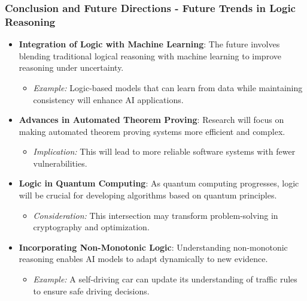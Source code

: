 \documentclass[aspectratio=169]{beamer}
\begin{document}
\begin{frame}[fragile]
    \frametitle{Conclusion and Future Directions - Future Trends in Logic Reasoning}
    \begin{itemize}
        \item \textbf{Integration of Logic with Machine Learning}:
        The future involves blending traditional logical reasoning with machine learning to improve reasoning under uncertainty.
        \begin{itemize}
            \item \textit{Example:} Logic-based models that can learn from data while maintaining consistency will enhance AI applications.
        \end{itemize}
        
        \item \textbf{Advances in Automated Theorem Proving}:
        Research will focus on making automated theorem proving systems more efficient and complex.
        \begin{itemize}
            \item \textit{Implication:} This will lead to more reliable software systems with fewer vulnerabilities.
        \end{itemize}

        \item \textbf{Logic in Quantum Computing}:
        As quantum computing progresses, logic will be crucial for developing algorithms based on quantum principles.
        \begin{itemize}
            \item \textit{Consideration:} This intersection may transform problem-solving in cryptography and optimization.
        \end{itemize}
        
        \item \textbf{Incorporating Non-Monotonic Logic}:
        Understanding non-monotonic reasoning enables AI models to adapt dynamically to new evidence.
        \begin{itemize}
            \item \textit{Example:} A self-driving car can update its understanding of traffic rules to ensure safe driving decisions.
        \end{itemize}
    \end{itemize}
\end{frame}
\end{document}
